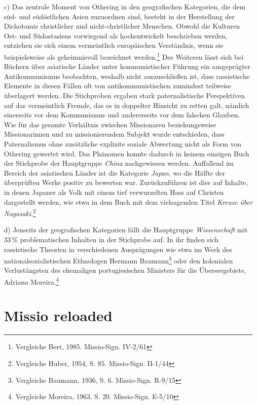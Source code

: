 \documentclass[a4paper,
fontsize=11pt,
oneside,
numbers=noperiodatend,
parskip=half-,
bibliography=totoc,
final
]{scrartcl}
\begin{document}
c) Das zentrale Moment von Othering in den geografischen Kategorien, die
dem süd- und südöstlichen Asien zuzuordnen sind, besteht in der
Herstellung der Dichotomie christlicher und nicht-christlicher Menschen.
Obwohl die Kulturen Ost- und Südostasiens vorwiegend als hochentwickelt
beschrieben werden, entziehen sie sich einem vermeintlich europäischen
Verständnis, wenn sie beispielsweise als geheimnisvoll bezeichnet
werden.\footnote{Vergleiche Bert, 1985. Missio-Sign. IV-2/61} Des
Weiteren lässt sich bei Büchern über asiatische Länder unter
kommunistischer Führung ein ausgeprägter Antikommunismus beobachten,
weshalb nicht auszuschließen ist, dass rassistische Elemente in diesen
Fällen oft von antikommunistischen zumindest teilweise überlagert
werden. Die Stichproben ergaben stark paternalistische Perspektiven auf
das vermeintlich Fremde, das es in doppelter Hinsicht zu retten galt,
nämlich einerseits vor dem Kommunismus und andererseits vor dem falschen
Glauben. Wie für das gesamte Verhältnis zwischen Missionaren
beziehungsweise Missionarinnen und zu missionierendem Subjekt wurde
entschieden, dass Paternalismus ohne zusätzliche explizite soziale
Abwertung nicht als Form von Othering gewertet wird. Das Phänomen konnte
dadurch in keinem einzigen Buch der Stichprobe der Hauptgruppe
\emph{China} nachgewiesen werden. Auffallend im Bereich der asiatischen
Länder ist die Kategorie \emph{Japan}, wo die Hälfte der überprüften
Werke positiv zu bewerten war. Zurückzuführen ist dies auf Inhalte, in
denen Japaner als Volk mit einem tief verwurzelten Hass auf Christen
dargestellt werden, wie etwa in dem Buch mit dem vielsagenden Titel
\emph{Kreuze über Nagasaki}.\footnote{Vergleiche Huber, 1954, S. 85.
  Missio-Sign. II-1/44}

d) Jenseits der geografischen Kategorien fällt die Hauptgruppe
\emph{Wissenschaft} mit 33\,\% problematischen Inhalten in der
Stichprobe auf. In ihr finden sich rassistische Theorien in
verschiedenen Ausprägungen wie etwa im Werk des nationalsozialistischen
Ethnologen Hermann Baumann\footnote{Vergleiche Baumann, 1936, S. 6.
  Missio-Sign. R-9/15} oder den kolonialen Verlustängsten des ehemaligen
portugiesischen Ministers für die Überseegebiete, Adriano
Moreira.\footnote{Vergleiche Moreira, 1963, S. 20. Missio-Sign. E-5/10}

\hypertarget{missio-reloaded}{%
\section{Missio reloaded}\label{missio-reloaded}}
\end{document}
